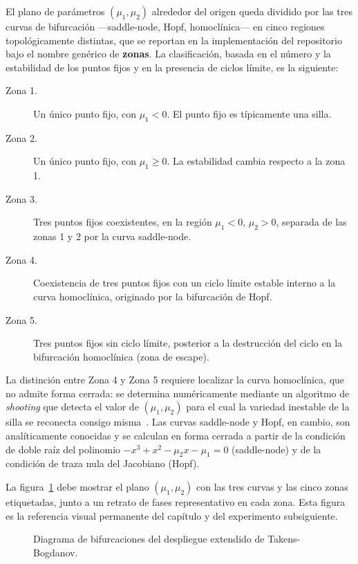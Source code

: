 El plano de parámetros $(\mu_1, \mu_2)$ alrededor del origen queda dividido por las tres curvas de bifurcación —saddle-node, Hopf, homoclínica— en cinco regiones topológicamente distintas, que se reportan en la implementación del repositorio bajo el nombre genérico de \textbf{zonas}. La clasificación, basada en el número y la estabilidad de los puntos fijos y en la presencia de ciclos límite, es la siguiente:

\begin{description}
    \item[Zona 1.] Un único punto fijo, con $\mu_1 < 0$. El punto fijo es típicamente una silla.
    \item[Zona 2.] Un único punto fijo, con $\mu_1 \geq 0$. La estabilidad cambia respecto a la zona 1.
    \item[Zona 3.] Tres puntos fijos coexistentes, en la región $\mu_1 < 0$, $\mu_2 > 0$, separada de las zonas 1 y 2 por la curva saddle-node.
    \item[Zona 4.] Coexistencia de tres puntos fijos con un ciclo límite estable interno a la curva homoclínica, originado por la bifurcación de Hopf.
    \item[Zona 5.] Tres puntos fijos sin ciclo límite, posterior a la destrucción del ciclo en la bifurcación homoclínica (zona de escape).
\end{description}

La distinción entre Zona 4 y Zona 5 requiere localizar la curva homoclínica, que no admite forma cerrada: se determina numéricamente mediante un algoritmo de \textit{shooting} que detecta el valor de $(\mu_1, \mu_2)$ para el cual la variedad inestable de la silla se reconecta consigo misma~\cite{kuznetsov2004}. Las curvas saddle-node y Hopf, en cambio, son analíticamente conocidas y se calculan en forma cerrada a partir de la condición de doble raíz del polinomio $-x^3 + x^2 - \mu_2 x - \mu_1 = 0$ (saddle-node) y de la condición de traza nula del Jacobiano (Hopf).

La figura~\ref{fig:diagrama_tb} debe mostrar el plano $(\mu_1, \mu_2)$ con las tres curvas y las cinco zonas etiquetadas, junto a un retrato de fases representativo en cada zona. Esta figura es la referencia visual permanente del capítulo y del experimento subsiguiente.

\begin{figure}[h]
\centering
{}
\caption{Diagrama de bifurcaciones del despliegue extendido de Takens-Bogdanov.}
\label{fig:diagrama_tb}
\end{figure}

